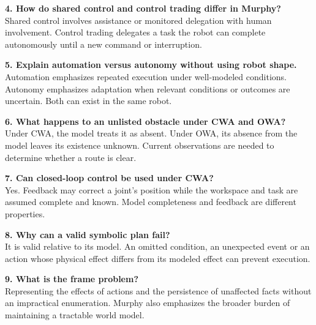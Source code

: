 \begin{samepage}\textbf{4. How do shared control and control trading differ in Murphy?}\\
Shared control involves assistance or monitored delegation with human involvement. Control trading delegates a task the robot can complete autonomously until a new command or interruption.\par\end{samepage}

\begin{samepage}\textbf{5. Explain automation versus autonomy without using robot shape.}\\
Automation emphasizes repeated execution under well-modeled conditions. Autonomy emphasizes adaptation when relevant conditions or outcomes are uncertain. Both can exist in the same robot.\par\end{samepage}

\begin{samepage}\textbf{6. What happens to an unlisted obstacle under CWA and OWA?}\\
Under CWA, the model treats it as absent. Under OWA, its absence from the model leaves its existence unknown. Current observations are needed to determine whether a route is clear.\par\end{samepage}

\begin{samepage}\textbf{7. Can closed-loop control be used under CWA?}\\
Yes. Feedback may correct a joint's position while the workspace and task are assumed complete and known. Model completeness and feedback are different properties.\par\end{samepage}

\begin{samepage}\textbf{8. Why can a valid symbolic plan fail?}\\
It is valid relative to its model. An omitted condition, an unexpected event or an action whose physical effect differs from its modeled effect can prevent execution.\par\end{samepage}

\begin{samepage}\textbf{9. What is the frame problem?}\\
Representing the effects of actions and the persistence of unaffected facts without an impractical enumeration. Murphy also emphasizes the broader burden of maintaining a tractable world model.\par\end{samepage}

